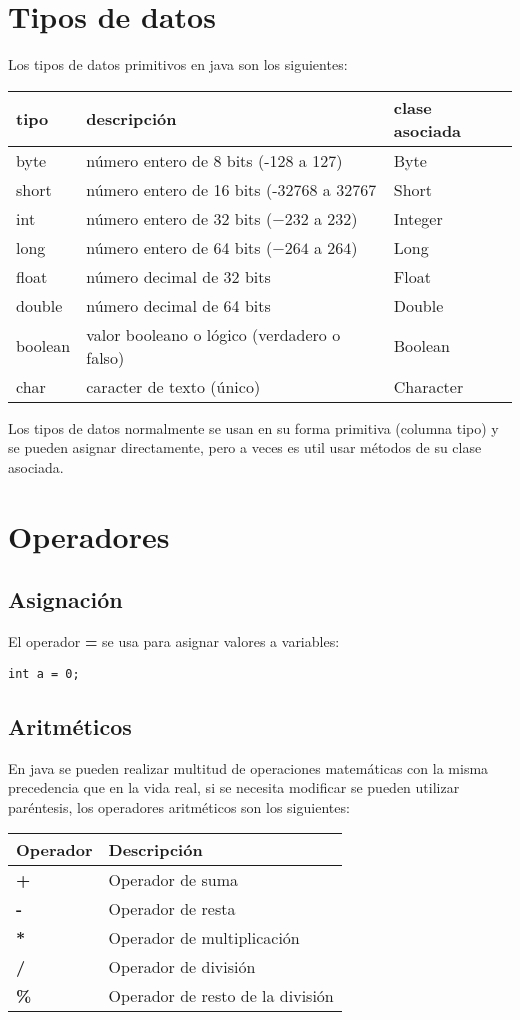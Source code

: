 \documentclass[11pt]{article}
\begin{document}
\section{Tipos de datos}
\label{sec:orga83ad0b}
Los tipos de datos primitivos en java son los siguientes:
\begin{center}
\begin{tabular}{lll}
tipo & descripción & clase asociada\\
\hline
byte & número entero de 8 bits (-128 a 127) & Byte\\
short & número entero de 16 bits (-32768 a 32767 & Short\\
int & número entero de 32 bits (\(-2{32}\) a \(2{32}\)) & Integer\\
long & número entero de 64 bits (\(-2{64}\) a \(2{64}\)) & Long\\
float & número decimal de 32 bits & Float\\
double & número decimal de 64 bits & Double\\
boolean & valor booleano o lógico (verdadero o falso) & Boolean\\
char & caracter de texto (único) & Character\\
\end{tabular}
\end{center}

Los tipos de datos normalmente se usan en su forma primitiva (columna tipo) y se pueden asignar directamente, pero a veces es util usar métodos de su clase asociada.
\section{Operadores}
\label{sec:org7301fdc}
\subsection{Asignación}
\label{sec:orgcbeabb2}
El operador \textbf{=} se usa para asignar valores a variables:
\begin{verbatim}
int a = 0;
\end{verbatim}
\subsection{Aritméticos}
\label{sec:orgd7417f2}
En java se pueden realizar multitud de operaciones matemáticas con la misma precedencia que en la vida real, si se necesita modificar se pueden utilizar paréntesis, los operadores aritméticos son los siguientes:
\begin{center}
\begin{tabular}{ll}
Operador & Descripción\\
\hline
\textbf{+} & Operador de suma\\
\textbf{-} & Operador de resta\\
\textbf{*} & Operador de multiplicación\\
\textbf{/} & Operador de división\\
\textbf{\%} & Operador de resto de la división\\
\end{tabular}
\end{center}
\end{document}
